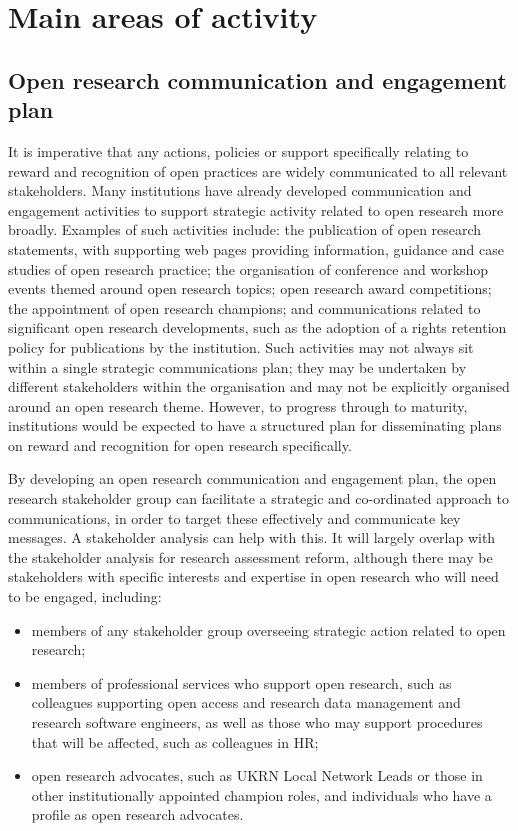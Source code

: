 \documentclass[
  letterpaper,
  DIV=11,
  numbers=noendperiod,
  oneside]{scrreprt}
\begin{document}
\section{Main areas of activity}\label{main-areas-of-activity-3}

\subsection{Open research communication and engagement
plan}\label{open-research-communication-and-engagement-plan}

It is imperative that any actions, policies or support specifically
relating to reward and recognition of open practices are widely
communicated to all relevant stakeholders. Many institutions have
already developed communication and engagement activities to support
strategic activity related to open research more broadly. Examples of
such activities include: the publication of open research statements,
with supporting web pages providing information, guidance and case
studies of open research practice; the organisation of conference and
workshop events themed around open research topics; open research award
competitions; the appointment of open research champions; and
communications related to significant open research developments, such
as the adoption of a rights retention policy for publications by the
institution. Such activities may not always sit within a single
strategic communications plan; they may be undertaken by different
stakeholders within the organisation and may not be explicitly organised
around an open research theme. However, to progress through to maturity,
institutions would be expected to have a structured plan for
disseminating plans on reward and recognition for open research
specifically.

By developing an open research communication and engagement plan, the
open research stakeholder group can facilitate a strategic and
co-ordinated approach to communications, in order to target these
effectively and communicate key messages. A stakeholder analysis can
help with this. It will largely overlap with the stakeholder analysis
for research assessment reform, although there may be stakeholders with
specific interests and expertise in open research who will need to be
engaged, including:

\begin{itemize}
\item
  members of any stakeholder group overseeing strategic action related
  to open research;
\item
  members of professional services who support open research, such as
  colleagues supporting open access and research data management and
  research software engineers, as well as those who may support
  procedures that will be affected, such as colleagues in HR;
\item
  open research advocates, such as UKRN Local Network Leads or those in
  other institutionally appointed champion roles, and individuals who
  have a profile as open research advocates.
\end{itemize}
\end{document}
